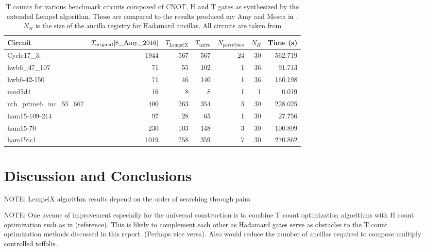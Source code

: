 \documentclass{article}
\theoremstyle{definition}
\theoremstyle{problem}
\theoremstyle{lemma}
\begin{document}
				\begin{table}
					\centering
					\begin{tabularx}{0.9\linewidth}{ |X|r|r|r|r|r|r| }
						\hline						
						Circuit & $T_{\text{original}}\cite{8_Amy_2016}$ & $T_{\text{LempelX}}$ & $T_{\text{naive}}$ & $N_{partitions}$ & $N_{H}$ & Time (s) \\
						\hline						
						Cycle17\_3: & 1944 & 567 & 567 & 24 & 30 & 562.719 \\
						hwb6\_47\_107 & 71 & 55 & 102 & 1 & 36 & 91.713 \\
						hwb6-42-150 & 71 & 46 & 140 & 1 & 36 & 160.198 \\
						mod5d4 & 16 & 8 & 8 & 1 & 1 & 0.019 \\
						nth\_prime6\_inc\_55\_667 & 400 & 263 & 354 & 5 & 30 & 228.025 \\
						ham15-109-214 & 97 & 28 & 65 & 1 & 30 & 27.756 \\
						ham15-70 & 230 & 103 & 148 & 3 & 30 & 100.899 \\
						ham15tc1 & 1019 & 258 & 359 & 7 & 30 & 270.862 \\
						\hline
					\end{tabularx}
					\caption{T counts for various benchmark circuits composed of CNOT, H and T gates as synthesized by the extended Lempel algorithm. These are compared to the results produced my Amy and Mosca in \cite{8_Amy_2016}. $N_H$ is the size of the ancilla registry for Hadamard ancillas. All circuits are taken from }
				\end{table}
			
			\FloatBarrier
			\section{Discussion and Conclusions}
			\label{s6_Discussion}
			
			NOTE: LempelX algorithm results depend on the order of searching through pairs
			
			NOTE: One avenue of improvement especially for the universal construction is to combine T count optimization algorithms with H count optimization such as in (reference). This is likely to complement each other as Hadamard gates serve as obstacles to the T count optimization methods discussed in this report. (Perhaps vice versa). Also would reduce the number of ancillas required to compose multiply controlled toffolis.
			
\end{document}
